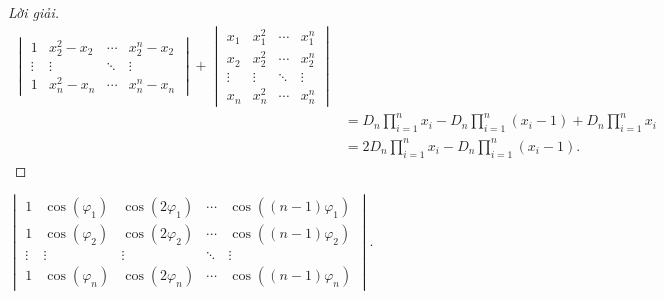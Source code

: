 \documentclass[class=nhvh-linear-algebra,crop=false]{standalone}
\begin{document}
\begin{proof}[Lời giải]
\begin{align*}
\begin{vmatrix}
            1      & x_{2}^{2} - x_{2} & \cdots & x_{2}^{n} - x_{2} \\
            \vdots & \vdots            & \ddots & \vdots            \\
            1      & x_{n}^{2} - x_{n} & \cdots & x_{n}^{n} - x_{n}
        \end{vmatrix}
        +
        \begin{vmatrix}
            x_{1}  & x_{1}^{2} & \cdots & x_{1}^{n} \\
            x_{2}  & x_{2}^{2} & \cdots & x_{2}^{n} \\
            \vdots & \vdots    & \ddots & \vdots    \\
            x_{n}  & x_{n}^{2} & \cdots & x_{n}^{n}
        \end{vmatrix}                                                      \\
         & = D_{n}\prod^{n}_{i=1}x_{i} - D_{n}\prod^{n}_{i=1}(x_{i} - 1) + D_{n}\prod^{n}_{i=1}x_{i} \\
         & = 2D_{n}\prod^{n}_{i=1}x_{i} - D_{n}\prod^{n}_{i=1}(x_{i} - 1).
    \end{align*}
    \endgroup{}
\end{proof}

\begin{exercise}
    $\begin{vmatrix}
            1      & \cos(\varphi_{1}) & \cos(2\varphi_{1}) & \cdots & \cos((n-1)\varphi_{1}) \\
            1      & \cos(\varphi_{2}) & \cos(2\varphi_{2}) & \cdots & \cos((n-1)\varphi_{2}) \\
            \vdots & \vdots            & \vdots             & \ddots & \vdots                 \\
            1      & \cos(\varphi_{n}) & \cos(2\varphi_{n}) & \cdots & \cos((n-1)\varphi_{n})
        \end{vmatrix}$.
\end{exercise}
\end{document}

